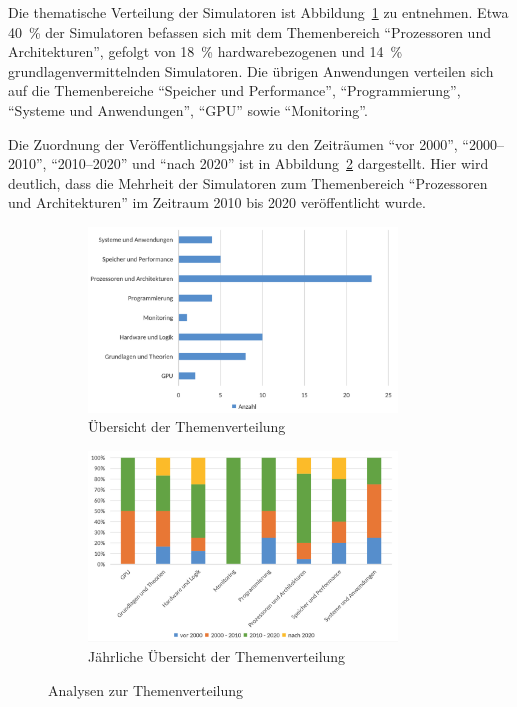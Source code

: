 Die thematische Verteilung der Simulatoren ist Abbildung~\ref{fig:7-thema} zu entnehmen. Etwa 40~\% der Simulatoren befassen sich mit dem Themenbereich \enquote{Prozessoren und Architekturen}, gefolgt von 18~\% hardwarebezogenen und 14~\% grundlagenvermittelnden Simulatoren. Die übrigen Anwendungen verteilen sich auf die Themenbereiche \enquote{Speicher und Performance}, \enquote{Programmierung}, \enquote{Systeme und Anwendungen}, \enquote{GPU} sowie \enquote{Monitoring}.

Die Zuordnung der Veröffentlichungsjahre zu den Zeiträumen \enquote{vor 2000}, \enquote{2000--2010}, \enquote{2010--2020} und \enquote{nach 2020} ist in Abbildung~\ref{fig:8-thema-jahr} dargestellt. Hier wird deutlich, dass die Mehrheit der Simulatoren zum Themenbereich \enquote{Prozessoren und Architekturen} im Zeitraum 2010 bis 2020 veröffentlicht wurde.

\begin{figure}[!htbp]
    \centering
    \begin{subfigure}[b]{0.48\textwidth}
        \centering
        \includegraphics[width=0.90\textwidth]{graphics_sim/7-thema.png}
        \caption{Übersicht der Themenverteilung}
        \label{fig:7-thema}
    \end{subfigure}
    \hfill
    \begin{subfigure}[b]{0.48\textwidth}
        \centering
        \includegraphics[width=0.90\textwidth]{graphics_sim/8-thema-jahr.png}
        \caption{Jährliche Übersicht der Themenverteilung}
        \label{fig:8-thema-jahr}
    \end{subfigure}
    \caption{Analysen zur Themenverteilung}
    \label{fig:themen-gesamt}
\end{figure}

